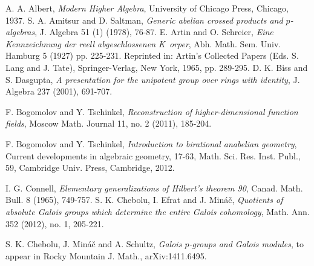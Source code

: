 \documentclass[12pt,leqno]{amsart}
\theoremstyle{plain}
\theoremstyle{definition}
\begin{document}
\begin{thebibliography}{999999999}
 A. A. Albert, {\it Modern Higher Algebra}, University of Chicago Press, Chicago, 1937. 
 S. A. Amitsur and D. Saltman, {\it Generic abelian crossed products and $p$-algebras}, J. Algebra 51 (1) (1978), 76-87.
 E. Artin and O. Schreier, {\it Eine Kennzeichnung der reell abgeschlossenen K\
orper}, Abh. Math. Sem. Univ. Hamburg 5 (1927) pp. 225-231. Reprinted in: Artin's Collected Papers (Eds. S. Lang and J. Tate), Springer-Verlag, New York, 1965,  pp. 289-295.
\bibitem[BD]{BD} D. K. Biss and S. Dasgupta, {\it A presentation for the unipotent group over rings with identity}, J. Algebra 237 (2001), 691-707.

 F. Bogomolov and Y. Tschinkel, {\it Reconstruction of higher-dimensional function fields},  Moscow Math. Journal 11, no. 2 (2011), 185-204.

 F. Bogomolov and Y. Tschinkel, {\it Introduction to birational anabelian geometry},  Current developments in algebraic geometry, 17-63,
Math. Sci. Res. Inst. Publ., 59, Cambridge Univ. Press, Cambridge, 2012.

 I. G. Connell, {\it Elementary generalizations of Hilbert's theorem 90}, Canad. Math. Bull. 8 (1965), 749-757.
\bibitem[CEM]{CEM} S. K. Chebolu, I. Efrat and J. Min\'a\v{c}, {\it Quotients of absolute Galois groups which determine the entire Galois cohomology}, Math. Ann. 352 (2012), no. 1, 205-221.

 S. K. Chebolu, J. Min\'a\v{c} and A. Schultz, {\it Galois $p$-groups and Galois modules}, to appear in Rocky Mountain J. Math., arXiv:1411.6495. 


\end{thebibliography}
\end{document}
